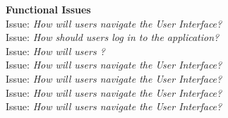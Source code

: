 \textbf{Functional Issues}
\\
Issue: \textit{How will users navigate the User Interface?}
\\

Issue: \textit{How should users log in to the application?}
\\

Issue: \textit{How will users ?}
\\

Issue: \textit{How will users navigate the User Interface?}
\\

Issue: \textit{How will users navigate the User Interface?}
\\

Issue: \textit{How will users navigate the User Interface?}
\\

Issue: \textit{How will users navigate the User Interface?}
